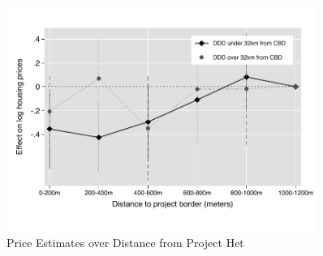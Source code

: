 \documentclass[12pt]{article}
\begin{document}
\begin{figure}
\caption{Price Estimates over Distance from Project Het}\label{figure:distplot_het}
\centering
\includegraphics[width=0.9\textwidth,trim={0cm .7cm 0cm 0.7cm},clip=true]{figures/price_regs_DDDplot_het_5.pdf}
\vspace{-2mm}
\end{figure}


% 

% 

\end{document}
